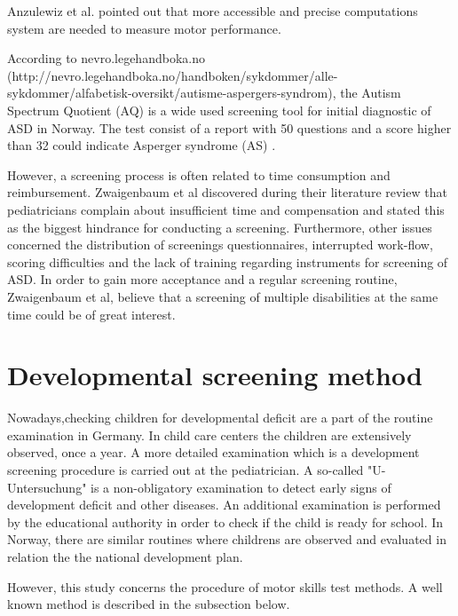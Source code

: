 Anzulewiz et al. pointed out that more accessible and precise computations  system are needed to measure motor performance.


According to nevro.legehandboka.no (http://nevro.legehandboka.no/handboken/sykdommer/alle-sykdommer/alfabetisk-oversikt/autisme-aspergers-syndrom), the Autism Spectrum Quotient (AQ) is a wide used screening tool for initial diagnostic of ASD in Norway. The test consist of a report with 50 questions and a score higher than 32 could indicate Asperger syndrome (AS) .

However, a screening process is often related to time consumption and reimbursement. Zwaigenbaum et al discovered during their literature review that pediatricians complain about insufficient time and compensation and stated this as the biggest hindrance for conducting a screening. Furthermore, other issues concerned the distribution of screenings questionnaires, interrupted work-flow, scoring difficulties and the lack of training regarding instruments for  screening of ASD. In order to gain more acceptance and a regular screening routine, Zwaigenbaum et al, believe that a  screening of multiple disabilities at the same time could be of great interest.



\section{Developmental screening method}
\label{sec:screeningmethod}
Nowadays,checking children for developmental deficit are a part of the routine examination in Germany. In child care centers the children are extensively observed, once a year.
A more detailed examination which is a development screening procedure is carried out at the pediatrician. A so-called "U-Untersuchung" is a non-obligatory examination to detect early signs of development deficit and other diseases.
An additional examination is performed by the educational authority in order to check if the child is ready for school.
In Norway, there are similar routines where childrens are observed and evaluated in relation the the national development plan.

However, this study concerns the procedure of motor skills test methods. A well known method is described in the subsection below. 




